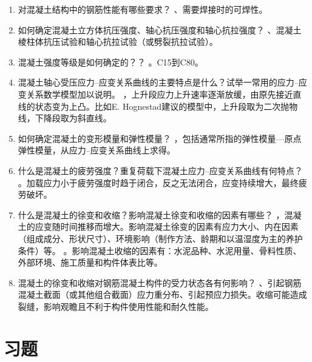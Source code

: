 \documentclass{article}
\newcommand{\gb}{《混凝土结构设计规范》（GB 50010）}
\begin{document}
\begin{enumerate}
\begin{enumerate}[1.]
              \item 对混凝土结构中的钢筋性能有哪些要求？
                    、需要焊接时的可焊性。
              \item 如何确定混凝土立方体抗压强度、轴心抗压强度和轴心抗拉强度？
                    、混凝土棱柱体抗压试验和轴心抗拉试验（或劈裂抗拉试验）。
              \item 混凝土强度等级是如何确定的？？
                    。C15到C80。
              \item 混凝土轴心受压应力--应变关系曲线的主要特点是什么？试举一常用的应力--应变关系数学模型加以说明。
                    ，上升段应力上升速率逐渐放缓，由原先接近直线的状态变为上凸。比如E. Hognestad建议的模型中，上升段取为二次抛物线，下降段取为斜直线。
              \item 如何确定混凝土的变形模量和弹性模量？
                    ，包括通常所指的弹性模量---原点弹性模量，从应力--应变关系曲线上求得。
              \item 什么是混凝土的疲劳强度？重复荷载下混凝土应力--应变关系曲线有何特点？
                    。加载应力小于疲劳强度时趋于闭合，反之无法闭合，应变持续增大，最终疲劳破坏。
              \item 什么是混凝土的徐变和收缩？影响混凝土徐变和收缩的因素有哪些？
                    ，混凝土的应变随时间推移而增大。影响混凝土徐变的因素有应力大小、内在因素（组成成分、形状尺寸）、环境影响（制作方法、龄期和以温湿度为主的养护条件）等。
                    。影响混凝土收缩的因素有：水泥品种、水泥用量、骨料性质、外部环境、施工质量和构件体表比等。
              \item 混凝土的徐变和收缩对钢筋混凝土构件的受力状态各有何影响？
                    、引起钢筋混凝土截面（或其他组合截面）应力重分布、引起预应力损失。收缩可能造成裂缝，影响观瞻且不利于构件使用性能和耐久性能。
          \end{enumerate}
\end{enumerate}
\section{习题}
\end{document}
